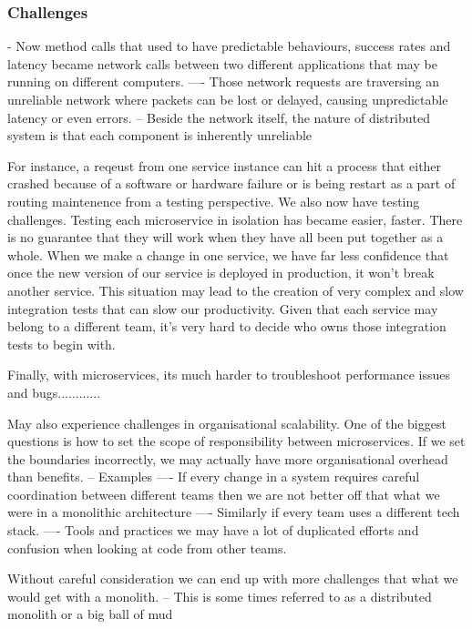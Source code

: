 \documentclass[a4paper, 11pt]{book}
\begin{document}
{    \subsubsection{Challenges}
    - Now method calls that used to have predictable behaviours, success rates and latency became network calls between two different applications that may be running on different computers.
    ---- Those network requests are traversing an unreliable network where packets can be lost or delayed, causing unpredictable latency or even errors.
    -- Beside the network itself, the nature of distributed system is that each component is inherently unreliable

    For instance, a reqeust from one service instance can hit a process that either crashed because of a software or hardware failure or is being restart as a part of routing maintenence from a testing perspective.
    We also now have testing challenges.
    Testing each microservice in isolation has became easier, faster.
    There is no guarantee that they will work when they have all been put together as a whole.
    When we make a change in one service, we have far less confidence that once the new version of our service is deployed in production, it won't break another service.
    This situation may lead to the creation of very complex and slow integration tests that can slow our productivity.
    Given that each service may belong to a different team, it's very hard to decide who owns those integration tests to begin with.

    Finally, with microservices, its much harder to troubleshoot performance issues and bugs............

    May also experience challenges in organisational scalability.
    One of the biggest questions is how to set the scope of responsibility between microservices.
    If we set the boundaries incorrectly, we may actually have more organisational overhead than benefits.
    -- Examples
    ---- If every change in a system requires careful coordination between different teams then we are not better off that what we were in a monolithic architecture
    ---- Similarly if every team uses a different tech stack.
    ---- Tools and practices we may have a lot of duplicated efforts and confusion when looking at code from other teams.

    Without careful consideration we can end up with more challenges that what we would get with a monolith.
    -- This is some times referred to as a distributed monolith or a big ball of mud

}
\end{document}
